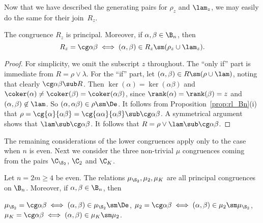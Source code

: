 


Now that we have described the generating pairs for $\rho_z$ and $\lam_z$, we may easily do the same for their join~$R_z$.


\begin{proposition}\label{prop:R01_Bn}
The congruence $R_z$ is principal.  Moreover, if $\alpha,\beta\in\B_n$, then
\[
R_z=\cg\alpha\beta\iff(\alpha,\beta)\in R_z\sm(\rho_z\cup\lam_z).
\]
\end{proposition}

\begin{proof}
For simplicity, we omit the subscript $z$ throughout.
The ``only if'' part is immediate from $R=\rho\vee\lambda$.
For the ``if'' part, let  $(\alpha,\beta)\in R\sm(\rho\cup\lam)$, noting that clearly $\cg\alpha\beta\sub R$.  
%
Then $\ker(\alpha)=\ker(\alpha\beta)$ and $\coker(\alpha)\not=\coker(\beta)=\coker(\alpha\beta)$, since $\rank(\alpha)=\rank(\beta)=z$ and $(\alpha,\beta)\not\in \lam$.  So $(\alpha,\alpha\beta)\in\rho\sm\De$.  It follows from Proposition~\ref{prop:rl_Bn}(i) that $\rho=\cg{\alpha}{\alpha\beta}=\cg{\alpha\alpha}{\alpha\beta}\sub\cg\alpha\beta$.  A symmetrical argument shows that $\lam\sub\cg\alpha\beta$.  It follows that $R=\rho\vee\lam\sub\cg\alpha\beta$. \end{proof}


The remaining considerations of the lower congruences apply only to the case when $n$ is even.  Next we consider the three non-trivial $\mu$ congruences coming from the pairs $\C_{\S_2}$, $\C_2$ and $\C_K$.


\newpage

\begin{proposition}\label{prop:nek}
Let $n=2m\geq4$ be even.  The relations $\mu_{\S_2},\mu_2,\mu_K$ are all principal congruences on $\B_n$.  Moreover, if $\alpha,\beta\in\B_n$, then
\begin{itemize}\begin{multicols}{2}
 $\mu_{\S_2}=\cg\alpha\beta\iff (\alpha,\beta)\in\mu_{\S_2}\sm\De$,
 $\mu_2=\cg\alpha\beta\iff (\alpha,\beta)\in\mu_2\sm\mu_{\S_2}$, 
 $\mu_K=\cg\alpha\beta\iff (\alpha,\beta)\in\mu_K\sm\mu_2$.
\end{multicols}\end{itemize}
\end{proposition}


